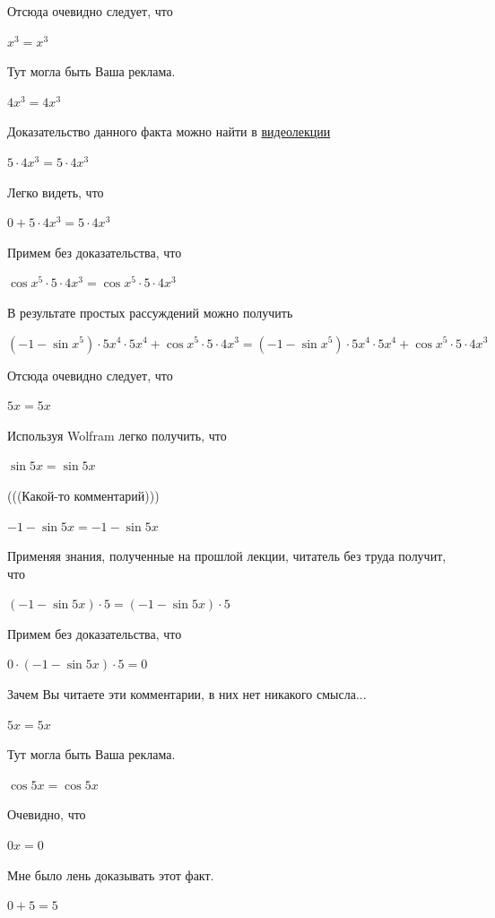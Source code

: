 \documentclass[12pt,a4paper,fleqn]{article}
\theoremstyle{definition}
\begin{document}
Отсюда очевидно следует, что 

${ x }^{ 3 } = { x }^{ 3 }$

Тут могла быть Ваша реклама. 

$ 4 { x }^{ 3 } =  4 { x }^{ 3 }$

Доказательство данного факта можно найти в \href{https://www.youtube.com/watch?v=dQw4w9WgXcQ}{видеолекции} 

$ 5  \cdot  4 { x }^{ 3 } =  5  \cdot  4 { x }^{ 3 }$

Легко видеть, что 

$ 0  +  5  \cdot  4 { x }^{ 3 } =  5  \cdot  4 { x }^{ 3 }$

Примем без доказательства, что 

$\cos{ x }^{ 5 } \cdot  5  \cdot  4 { x }^{ 3 } = \cos{ x }^{ 5 } \cdot  5  \cdot  4 { x }^{ 3 }$

В результате простых рассуждений можно получить 

$( -1  - \sin{ x }^{ 5 }) \cdot  5 { x }^{ 4 } \cdot  5 { x }^{ 4 } + \cos{ x }^{ 5 } \cdot  5  \cdot  4 { x }^{ 3 } = ( -1  - \sin{ x }^{ 5 }) \cdot  5 { x }^{ 4 } \cdot  5 { x }^{ 4 } + \cos{ x }^{ 5 } \cdot  5  \cdot  4 { x }^{ 3 }$

Отсюда очевидно следует, что 

$ 5  x  =  5  x $

Используя Wolfram легко получить, что 

$\sin 5  x  = \sin 5  x $

(((Какой-то комментарий))) 

$ -1  - \sin 5  x  =  -1  - \sin 5  x $

Применяя знания, полученные на прошлой лекции, читатель без труда получит, что 

$( -1  - \sin 5  x ) \cdot  5  = ( -1  - \sin 5  x ) \cdot  5 $

Примем без доказательства, что 

$ 0  \cdot ( -1  - \sin 5  x ) \cdot  5  =  0 $

Зачем Вы читаете эти комментарии, в них нет никакого смысла... 

$ 5  x  =  5  x $

Тут могла быть Ваша реклама. 

$\cos 5  x  = \cos 5  x $

Очевидно, что 

$ 0  x  =  0 $

Мне было лень доказывать этот факт.

$ 0  +  5  =  5 $
\end{document}
